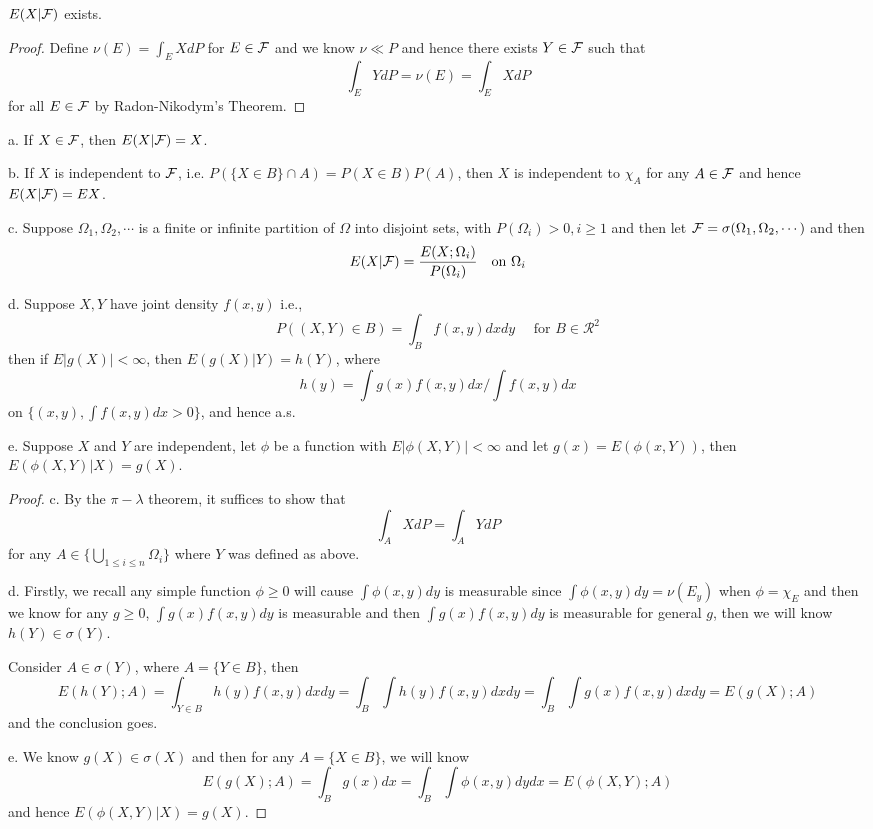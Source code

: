 \begin{theorem}
    $E(X|\mathcal{F})$ exists.
\end{theorem}
\begin{proof}\par
    Define $\nu(E) = \int_E XdP$ for $E\in\mathcal{F}$ and we know $\nu \ll P$ and hence there exists $Y\in\mathcal{F}$ such that
    \[\int_E YdP = \nu(E) = \int_E XdP\]
    for all $E\in\mathcal{F}$ by Radon-Nikodym's Theorem.
\end{proof}

\begin{example}
    a. If $X\in\mathcal{F}$, then $E(X|\mathcal{F}) = X$.\par
    b. If $X$ is independent to $\mathcal{F}$, i.e. $P(\{X\in B\}\cap A) = P(X\in B)P(A)$, then $X$ is independent to $\chi_A$ for any $A\in\mathcal{F}$ and hence $E(X|\mathcal{F})= EX$.\par
    c. Suppose $\Omega_1,\Omega_2,\cdots$ is a finite or infinite partition of $\Omega$ into disjoint sets, with $P(\Omega_i) > 0, i\geq 1$ and then let $\mathcal{F} = \sigma(\Omega_1,\Omega_2,\cdots)$ and then
    \[E(X|\mathcal{F}) = \dfrac{E(X;\Omega_i)}{P(\Omega_i)}\quad\text{on }\Omega_i\]\par
    d. Suppose $X,Y$ have joint density $f(x,y)$ i.e.,
    \[P((X,Y)\in B) = \int_B f(x,y) dxdy\quad\text{ for }B\in\mathcal{R}^2\]
    then if $E|g(X)|<\infty$, then $E(g(X)|Y) = h(Y)$, where  
    \[h(y) = \int g(x)f(x,y)dx/\int f(x,y)dx\]
    on $\{(x,y), \int f(x,y) dx > 0\}$, and hence a.s.\par
    e. Suppose $X$ and $Y$ are independent, let $\phi$ be a function with $E|\phi(X,Y)|<\infty$ and let $g(x) = E(\phi(x,Y))$, then $E(\phi(X,Y)|X) = g(X)$.
    \end{example}
\begin{proof}\par
c. By the $\pi-\lambda$ theorem, it suffices to show that
\[\int_A XdP = \int_A YdP\]
for any $A\in\{\bigcup_{1\leq i \leq n}\Omega_i\}$ where $Y$ was defined as above.\par
d. Firstly, we recall any simple function $\phi \geq 0$ will cause $\int \phi(x,y)dy$ is measurable since $\int \phi(x,y)dy = \nu(E_y)$ when $\phi = \chi_E$ and then we know for any $g\geq 0$, $\int g(x)f(x,y)dy$ is measurable and then $\int g(x)f(x,y)dy$ is measurable for general $g$, then we will know $h(Y)\in\sigma(Y)$.\par 
Consider $A\in \sigma(Y)$, where $A = \{Y\in B\}$, then
\[E(h(Y);A) = \int_{Y\in B} h(y)f(x,y)dx dy = \int_B \int h(y)f(x,y)dxdy = \int_B \int g(x)f(x,y)dxdy = E(g(X);A)\]
and the conclusion goes.\par
e. We know $g(X)\in \sigma(X)$ and then for any $A = \{X\in B\}$, we will know
\[E(g(X);A) = \int_B g(x)dx = \int_B \int \phi(x,y) dy dx = E(\phi(X,Y);A)\]
and hence $E(\phi(X,Y)|X) = g(X)$.
\end{proof}


